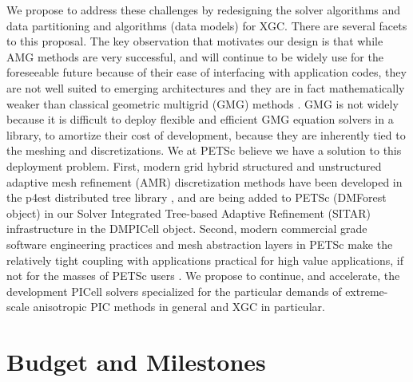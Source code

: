 \documentclass[review]{siamart}
\begin{document}
We propose to address these challenges by redesigning the solver algorithms and data partitioning and algorithms (data models) for XGC.
There are several facets to this proposal.
The key observation that motivates our design is that while AMG methods are very successful, and will continue to be widely use for the foreseeable future because of their ease of interfacing with application codes, they are not well suited to emerging architectures and they are in fact mathematically weaker than classical geometric multigrid (GMG) methods \cite{Brandt-77}.
GMG is not widely because it is difficult to deploy flexible and efficient GMG equation solvers in a library, to amortize their cost of development, because they are inherently tied to the meshing and discretizations.
We at PETSc believe we have a solution to this deployment problem.
First, modern grid hybrid structured and unstructured adaptive mesh refinement (AMR) discretization methods have been developed in the p4est distributed tree library \cite{DBLP:journals/siamsc/IsaacBWG15,Rudi:2015:EIS:2807591.2807675,Stadler1033}, and are being added to PETSc (DMForest object) in our Solver Integrated Tree-based Adaptive Refinement (SITAR) infrastructure in the DMPICell object.
Second, modern commercial grade software engineering practices and mesh abstraction layers in PETSc make the relatively tight coupling with applications practical for high value applications, if not for the masses of PETSc users \cite{KnepleyBrownMcInnesSmithRuppAdams2015b}.
We propose to continue, and accelerate, the development PICell solvers specialized for the particular demands of extreme-scale anisotropic PIC methods in general and XGC in particular.

\section{Budget and Milestones}
\label{sec:mile}
\end{document}
